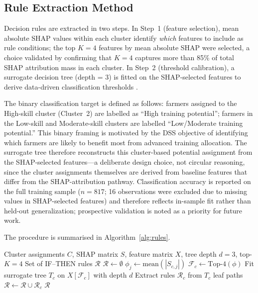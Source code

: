 \documentclass[3p,twocolumn,authoryear]{elsarticle}
\begin{document}
\subsection{Rule Extraction Method}

Decision rules are extracted in two steps.
In Step~1 (feature selection), mean absolute SHAP values within each
cluster identify \textit{which} features to include as rule conditions;
the top $K = 4$ features by mean absolute SHAP were selected, a choice
validated by confirming that $K = 4$ captures more than 85\% of total
SHAP attribution mass in each cluster.
In Step~2 (threshold calibration), a surrogate decision tree (depth = 3)
is fitted on the SHAP-selected features to derive data-driven
classification thresholds \citep{guidotti2019,molnar2022}.

The binary classification target is defined as follows: farmers assigned
to the High-skill cluster (Cluster~2) are labelled as ``High training
potential''; farmers in the Low-skill and Moderate-skill clusters are
labelled ``Low/Moderate training potential.''
This binary framing is motivated by the DSS objective of identifying
which farmers are likely to benefit most from advanced training
allocation.
The surrogate tree therefore reconstructs this cluster-based potential
assignment from the SHAP-selected features---a deliberate design choice,
not circular reasoning, since the cluster assignments themselves are
derived from baseline features that differ from the SHAP-attribution
pathway.
Classification accuracy is reported on the full training sample ($n =
817$; 16 observations were excluded due to missing values in
SHAP-selected features) and therefore reflects in-sample fit rather
than held-out generalization; prospective validation is noted as a
priority for future work.

The procedure is summarised in Algorithm~\ref{alg:rules}.

\begin{algorithm}
\caption{SHAP-guided Surrogate Rule Extraction}
\label{alg:rules}
\begin{algorithmic}[1]
\Require Cluster assignments $C$, SHAP matrix $S$,
         feature matrix $X$, tree depth $d = 3$, top-$K = 4$
\Ensure Set of IF--THEN rules $\mathcal{R}$
\State $\mathcal{R} \gets \emptyset$
    \State $\phi_j \gets \text{mean}(|S_{c,j}|)$
    \State $\mathcal{F}_c \gets \text{Top-}4(\phi)$
    \State Fit surrogate tree $T_c$ on $X[\mathcal{F}_c]$
           with depth $d$
    \State Extract rules $\mathcal{R}_c$ from $T_c$ leaf paths
    \State $\mathcal{R} \gets \mathcal{R} \cup \mathcal{R}_c$
\EndFor
\State \Return $\mathcal{R}$
\end{algorithmic}
\end{algorithm}
\end{document}

